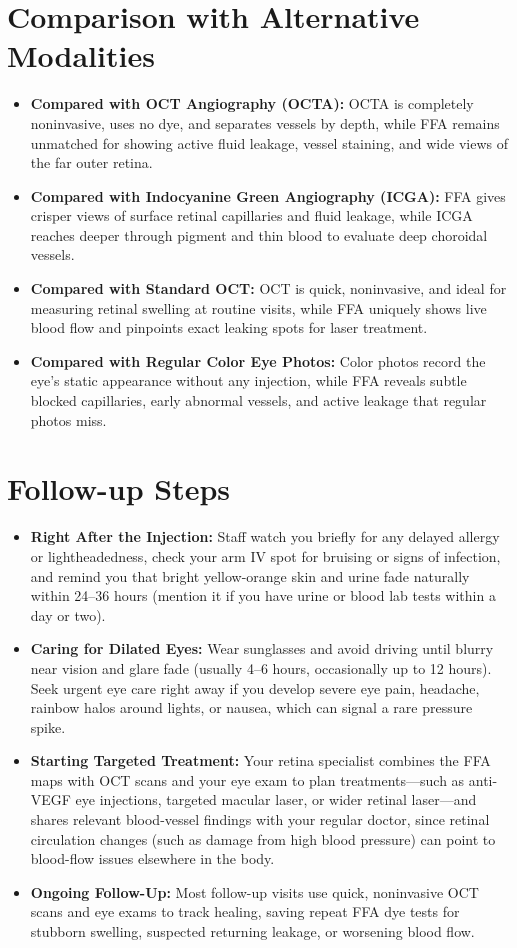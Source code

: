 \section{Comparison with Alternative Modalities}

\begin{itemize}
    \item \textbf{Compared with OCT Angiography (OCTA):} OCTA is completely noninvasive, uses no dye, and separates vessels by depth, while FFA remains unmatched for showing active fluid leakage, vessel staining, and wide views of the far outer retina.
    \item \textbf{Compared with Indocyanine Green Angiography (ICGA):} FFA gives crisper views of surface retinal capillaries and fluid leakage, while ICGA reaches deeper through pigment and thin blood to evaluate deep choroidal vessels.
    \item \textbf{Compared with Standard OCT:} OCT is quick, noninvasive, and ideal for measuring retinal swelling at routine visits, while FFA uniquely shows live blood flow and pinpoints exact leaking spots for laser treatment.
    \item \textbf{Compared with Regular Color Eye Photos:} Color photos record the eye's static appearance without any injection, while FFA reveals subtle blocked capillaries, early abnormal vessels, and active leakage that regular photos miss.
\end{itemize}

\section{Follow-up Steps}

\begin{itemize}
    \item \textbf{Right After the Injection:} Staff watch you briefly for any delayed allergy or lightheadedness, check your arm IV spot for bruising or signs of infection, and remind you that bright yellow-orange skin and urine fade naturally within 24--36 hours (mention it if you have urine or blood lab tests within a day or two).
    \item \textbf{Caring for Dilated Eyes:} Wear sunglasses and avoid driving until blurry near vision and glare fade (usually 4--6 hours, occasionally up to 12 hours). Seek urgent eye care right away if you develop severe eye pain, headache, rainbow halos around lights, or nausea, which can signal a rare pressure spike.
    \item \textbf{Starting Targeted Treatment:} Your retina specialist combines the FFA maps with OCT scans and your eye exam to plan treatments---such as anti-VEGF eye injections, targeted macular laser, or wider retinal laser---and shares relevant blood-vessel findings with your regular doctor, since retinal circulation changes (such as damage from high blood pressure) can point to blood-flow issues elsewhere in the body.
    \item \textbf{Ongoing Follow-Up:} Most follow-up visits use quick, noninvasive OCT scans and eye exams to track healing, saving repeat FFA dye tests for stubborn swelling, suspected returning leakage, or worsening blood flow.
\end{itemize}

